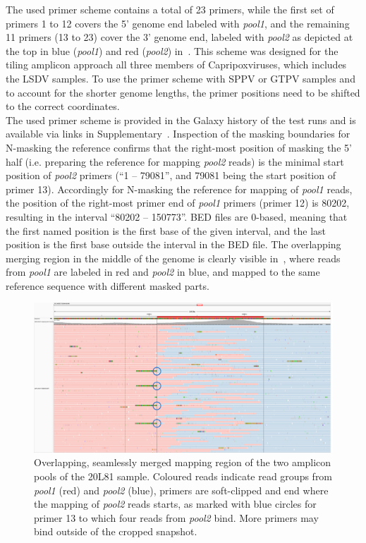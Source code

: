 The used primer scheme contains a total of 23 primers, while the first set of primers 1 to 12 covers the 5' genome end labeled with \textit{pool1}, and the remaining 11 primers (13 to 23) cover the 3' genome end, labeled with \textit{pool2} as depicted at the top in blue (\textit{pool1}) and red (\textit{pool2}) in~. This scheme was designed for the tiling amplicon approach all three members of Capripoxviruses, which includes the \ac{LSDV} samples. To use the primer scheme with \ac{SPPV} or \ac{GTPV} samples and to account for the shorter genome lengths, the primer positions need to be shifted to the correct coordinates.\\
The used primer scheme is provided in the Galaxy history of the test runs and is available via links in Supplementary~. Inspection of the masking boundaries for N-masking the reference confirms that the right-most position of masking the 5' half (i.e. preparing the reference for mapping \textit{pool2} reads) is the minimal start position of \textit{pool2} primers (``1 -- 79081'', and 79081 being the start position of primer 13). Accordingly for N-masking the reference for mapping of \textit{pool1} reads, the position of the right-most primer end of \textit{pool1} primers (primer 12) is 80202, resulting in the interval ``80202 -- 150773''. \ac{BED} files are 0-based, meaning that the first named position is the first base of the given interval, and the last position is the first base outside the interval in the \ac{BED} file. The overlapping merging region in the middle of the genome is clearly visible in~, where reads from \textit{pool1} are labeled in red and \textit{pool2} in blue, and mapped to the same reference sequence with different masked parts. 
\begin{figure}[ht!]
    \centering
    \hspace*{-24pt}
    \includegraphics[width=1.1\textwidth]{media/4-lsdv-alig-20L81-c.png}
    \caption[Overlapping reads region of LSDV mapping in 20L81 sample.]{Overlapping, seamlessly merged mapping region of the two amplicon pools of the 20L81 sample. Coloured reads indicate read groups from \textit{pool1} (red) and \textit{pool2} (blue), primers are soft-clipped and end where the mapping of \textit{pool2} reads starts, as marked with blue circles for primer 13 to which four reads from \textit{pool2} bind. More primers may bind outside of the cropped snapshot.}
    \label{fig:4-lsdv-read-groups}
\end{figure}

